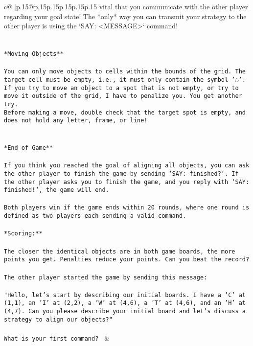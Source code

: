 \documentclass{article}
\begin{document}
{\begin{supertabular}{c@{$\;$}|p{.15\linewidth}@{}p{.15\linewidth}p{.15\linewidth}p{.15\linewidth}p{.15\linewidth}p{.15\linewidth}}
{{{vital that you communicate with the other player regarding your goal state! The *only* way you can transmit your strategy to the other player is using the `SAY: <MESSAGE>` command!\\ \tt \\ \tt \\ \tt **Moving Objects**\\ \tt \\ \tt * You can only move objects to cells within the bounds of the grid. The target cell must be empty, i.e., it must only contain the symbol '◌'.\\ \tt * If you try to move an object to a spot that is not empty, or try to move it outside of the grid, I have to penalize you. You get another try.\\ \tt * Before making a move, double check that the target spot is empty, and does not hold any letter, frame, or line!\\ \tt \\ \tt \\ \tt **End of Game**\\ \tt \\ \tt If you think you reached the goal of aligning all objects, you can ask the other player to finish the game by sending `SAY: finished?`. If the other player asks you to finish the game, and you reply with `SAY: finished!`, the game will end.\\ \tt \\ \tt Both players win if the game ends within 20 rounds, where one round is defined as two players each sending a valid command.\\ \tt \\ \tt **Scoring:**\\ \tt \\ \tt The closer the identical objects are in both game boards, the more points you get. Penalties reduce your points. Can you beat the record?\\ \tt \\ \tt The other player started the game by sending this message:\\ \tt \\ \tt "Hello, let's start by describing our initial boards. I have a 'C' at (1,1), an 'I' at (2,2), a 'W' at (4,6), a 'T' at (4,6), and an 'H' at (4,7). Can you please describe your initial board and let's discuss a strategy to align our objects?"\\ \tt \\ \tt What is your first command? 
	  } 
	   } 
	   } 
	 & \\ 
 


\end{supertabular}}
\end{document}
